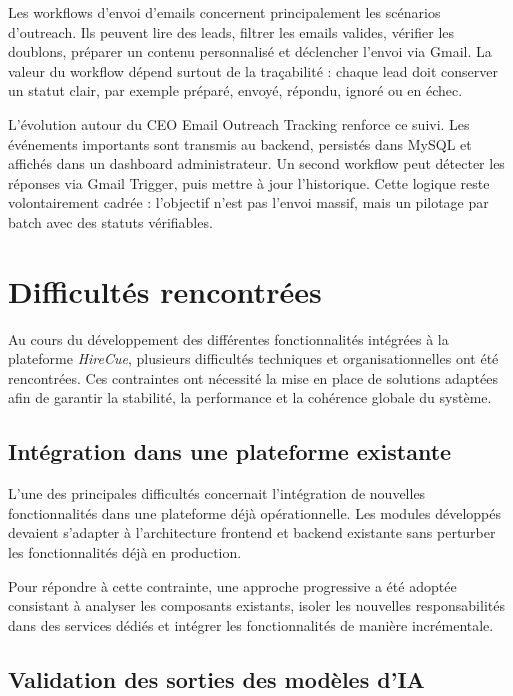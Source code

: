Les workflows d'envoi d'emails concernent principalement les scénarios d'outreach. Ils peuvent lire des leads, filtrer les emails valides, vérifier les doublons, préparer un contenu personnalisé et déclencher l'envoi via Gmail. La valeur du workflow dépend surtout de la traçabilité : chaque lead doit conserver un statut clair, par exemple préparé, envoyé, répondu, ignoré ou en échec.

L'évolution autour du CEO Email Outreach Tracking renforce ce suivi. Les événements importants sont transmis au backend, persistés dans MySQL et affichés dans un dashboard administrateur. Un second workflow peut détecter les réponses via Gmail Trigger, puis mettre à jour l'historique. Cette logique reste volontairement cadrée : l'objectif n'est pas l'envoi massif, mais un pilotage par batch avec des statuts vérifiables.

\section{Difficultés rencontrées}

Au cours du développement des différentes fonctionnalités intégrées à la plateforme \textit{HireCue}, plusieurs difficultés techniques et organisationnelles ont été rencontrées. Ces contraintes ont nécessité la mise en place de solutions adaptées afin de garantir la stabilité, la performance et la cohérence globale du système.

\subsection{Intégration dans une plateforme existante}

L'une des principales difficultés concernait l'intégration de nouvelles fonctionnalités dans une plateforme déjà opérationnelle. Les modules développés devaient s'adapter à l'architecture frontend et backend existante sans perturber les fonctionnalités déjà en production.

Pour répondre à cette contrainte, une approche progressive a été adoptée consistant à analyser les composants existants, isoler les nouvelles responsabilités dans des services dédiés et intégrer les fonctionnalités de manière incrémentale.

\subsection{Validation des sorties des modèles d'IA}

